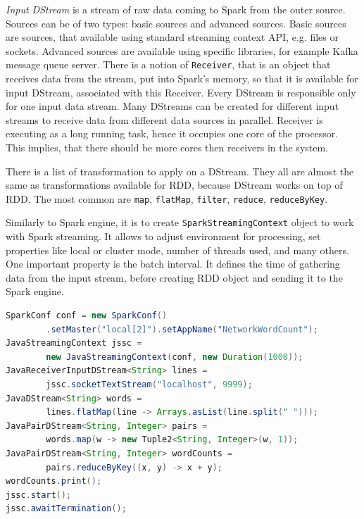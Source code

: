 \textit{Input DStream} is a stream of raw data coming to Spark from the outer source.
Sources can be of two types: basic sources and advanced sources.
Basic sources are sources, that available using standard streaming context API, e.g. files or sockets.
Advanced sources are available using specific libraries, for example Kafka message queue server.
There is a notion of \lstinline{Receiver}, that is an object that receives data from the stream, put into Spark's memory, so that it is available for input DStream, associated with this Receiver.
Every DStream is responsible only for one input data stream.
Many DStreams can be created for different input streams to receive data from different data sources in parallel.
Receiver is executing as a long running task, hence it occupies one core of the processor.
This implies, that there should be more cores then receivers in the system.

There is a list of transformation to apply on a DStream.
They all are almost the same as transformations available for RDD, because DStream works on top of RDD.
The most common are \lstinline{map}, \lstinline{flatMap}, \lstinline{filter}, \lstinline{reduce}, \lstinline{reduceByKey}.

Similarly to Spark engine, it is to create \lstinline{SparkStreamingContext} object to work with Spark streaming.
It allows to adjust environment for processing, set properties like local or cluster mode, number of threads used, and many others.
One important property is the batch interval.
It defines the time of gathering data from the input stream, before creating RDD object and sending it to the Spark engine.

\begin{lstlisting}[float=h, caption={Counting the frequencies of words in the text lines, coming from the TCP socket.}, label=listing:DStreamExampleCode, language=Java]
SparkConf conf = new SparkConf()
		.setMaster("local[2]").setAppName("NetworkWordCount");
JavaStreamingContext jssc =
		new JavaStreamingContext(conf, new Duration(1000));
JavaReceiverInputDStream<String> lines =
		jssc.socketTextStream("localhost", 9999);
JavaDStream<String> words =
		lines.flatMap(line -> Arrays.asList(line.split(" ")));
JavaPairDStream<String, Integer> pairs =
		words.map(w -> new Tuple2<String, Integer>(w, 1));
JavaPairDStream<String, Integer> wordCounts =
		pairs.reduceByKey((x, y) -> x + y);
wordCounts.print();
jssc.start();
jssc.awaitTermination();
\end{lstlisting}

